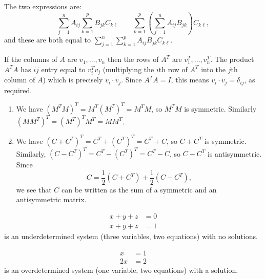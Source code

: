 \documentclass{article}
\begin{document}
\begin{Solution}\label{sol:exr:assoc}
The two expressions are:
\[\sum_{j=1}^nA_{ij}\sum_{k=1}^pB_{jk}C_{k\ell}\qquad
\sum_{k=1}^p\left(\sum_{j=1}^nA_{ij}B_{jk}\right)C_{k\ell},\] and
these are both equal to \(\sum_{j=1}^n\sum_{k=1}^p
A_{ij}B_{jk}C_{k\ell}\).


\end{Solution}
\begin{Solution}\label{sol:exr:orthogmat}
If the columns of \(A\) are \(v_1,\ldots,v_n\) then the rows of
\(A^T\) are \(v_1^T,\ldots,v_n^T\). The product \(A^TA\) has \(ij\)
entry equal to \(v_i^Tv_j\) (multiplying the \(i\)th row of \(A^T\)
into the \(j\)th column of \(A\)) which is precisely \(v_i\cdot
v_j\). Since \(A^TA=I\), this means \(v_i\cdot v_j=\delta_{ij}\), as
required. \qedhere


\end{Solution}
\begin{Solution}\label{sol:exr:symmantisymm}
\begin{enumerate}
\item We have \((M^TM)^T=M^T(M^T)^T=M^TM\), so \(M^TM\) is
symmetric. Similarly \((MM^T)^T=(M^T)^TM^T=MM^T\).
\item We have \((C+C^T)^T=C^T+(C^T)^T=C^T+C\), so \(C+C^T\) is
symmetric. Similarly, \((C-C^T)^T=C^T-(C^T)^T=C^T-C\), so
\(C-C^T\) is antisymmetric. Since
\[C=\frac{1}{2}(C+C^T)+\frac{1}{2}(C-C^T),\]
we see that \(C\) can be written as the sum of a symmetric and an
antisymmetric matrix.


\end{enumerate}
\end{Solution}
\begin{Solution}
\begin{align*}
x+y+z&=0\\
x+y+z&=1
\end{align*}
is an underdetermined system (three variables, two equations) with
no solutions.


\begin{align*}
x&=1\\
2x&=2
\end{align*}
is an overdetermined system (one variable, two equations) with a
solution.


\end{Solution}
\newpage
\end{document}
